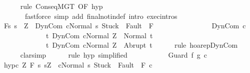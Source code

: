 \begin{isabellebody}
\ \ \ \ \isamarkupfalse%
\ {\isacharparenleft}rule\ ConseqMGT\ {\isacharbrackleft}OF\ hyp{\isacharbrackright}{\isacharparenright}\isanewline
\ \ \ \ \ \ \ {\isacharparenleft}fastforce\ simp\ add{\isacharcolon}\ final{\isacharunderscore}notin{\isacharunderscore}def\ intro{\isacharcolon}\ exec{\isachardot}intros{\isacharparenright}\isanewline
\ \ \isamarkupfalse%
\ {\isachardoublequoteopen}{\isasymGamma}{\isacharcomma}{\isasymTheta}{\isasymturnstile}\isactrlbsub {\isacharslash}F\isactrlesub {\isacharbraceleft}s{\isachardot}\ s\ {\isacharequal}\ Z\ {\isasymand}\ {\isasymGamma}{\isasymturnstile}{\isasymlangle}DynCom\ c{\isacharcomma}Normal\ s{\isasymrangle}\ {\isasymRightarrow}{\isasymnotin}{\isacharparenleft}{\isacharbraceleft}Stuck{\isacharbraceright}\ {\isasymunion}\ Fault\ {\isacharbackquote}\ {\isacharparenleft}{\isacharminus}F{\isacharparenright}{\isacharparenright}{\isacharbraceright}\ \isanewline
\ \ \ \ \ \ \ \ \ \ \ \ \ \ \ DynCom\ c\isanewline
\ \ \ \ \ \ \ \ \ \ \ \ \ {\isacharbraceleft}t{\isachardot}\ {\isasymGamma}{\isasymturnstile}{\isasymlangle}DynCom\ c{\isacharcomma}Normal\ Z{\isasymrangle}\ {\isasymRightarrow}\ Normal\ t{\isacharbraceright}{\isacharcomma}\isanewline
\ \ \ \ \ \ \ \ \ \ \ \ \ {\isacharbraceleft}t{\isachardot}\ {\isasymGamma}{\isasymturnstile}{\isasymlangle}DynCom\ c{\isacharcomma}Normal\ Z{\isasymrangle}\ {\isasymRightarrow}\ Abrupt\ t{\isacharbraceright}{\isachardoublequoteclose}\isanewline
\ \ \ \ \isamarkupfalse%
\ {\isacharparenleft}rule\ hoarep{\isachardot}DynCom{\isacharparenright}\isanewline
\ \ \ \ \isamarkupfalse%
\ {\isacharparenleft}clarsimp{\isacharparenright}\isanewline
\ \ \ \ \isamarkupfalse%
\ {\isacharparenleft}rule\ hyp{\isacharprime}\ {\isacharbrackleft}simplified{\isacharbrackright}{\isacharparenright}\isanewline
\ \ \ \ \isamarkupfalse%
\isanewline
{}\isamarkupfalse%
\ \ \isanewline
\ \ \isamarkupfalse%
\ {\isacharparenleft}Guard\ f\ g\ c{\isacharparenright}\isanewline
\ \ \isamarkupfalse%
\ hyp{\isacharunderscore}c{\isacharcolon}\ {\isachardoublequoteopen}{\isasymforall}Z{\isachardot}\ {\isasymGamma}{\isacharcomma}{\isasymTheta}{\isasymturnstile}\isactrlbsub {\isacharslash}F\isactrlesub \ {\isacharbraceleft}s{\isachardot}\ s{\isacharequal}Z\ {\isasymand}\ {\isasymGamma}{\isasymturnstile}{\isasymlangle}c{\isacharcomma}Normal\ s{\isasymrangle}\ {\isasymRightarrow}{\isasymnotin}{\isacharparenleft}{\isacharbraceleft}Stuck{\isacharbraceright}\ {\isasymunion}\ Fault\ {\isacharbackquote}\ {\isacharparenleft}{\isacharminus}F{\isacharparenright}{\isacharparenright}{\isacharbraceright}\ c\isanewline

\end{isabellebody}
